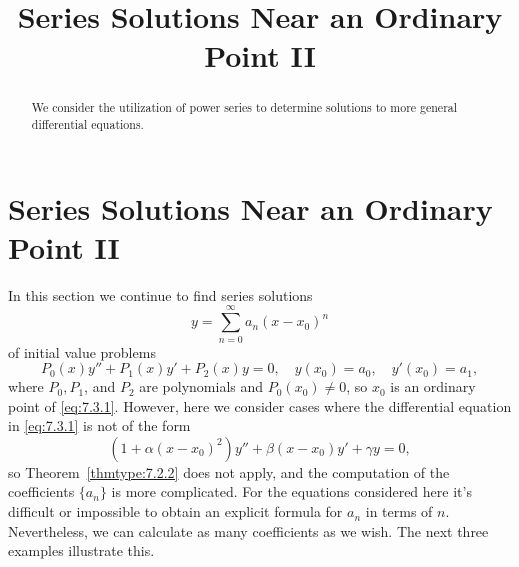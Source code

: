 \documentclass{ximera}
\title{Series Solutions Near an Ordinary Point II}%
\begin{document}
\begin{abstract}
We consider the utilization of power series to determine solutions to more general differential equations.
\end{abstract}

\maketitle

\section*{Series Solutions Near an Ordinary Point II}

In this section we continue to find series solutions
$$
y=\sum_{n=0}^\infty a_n(x-x_0)^n
$$
of initial value problems
\begin{equation} \label{eq:7.3.1}
P_0(x)y''+P_1(x)y'+P_2(x)y=0,\quad y(x_0)=a_0,\quad y'(x_0)=a_1,
\end{equation}
where $P_0,P_1$, and $P_2$ are polynomials and $P_0(x_0)\neq0$,
so $x_0$ is an ordinary point of \eqref{eq:7.3.1}.  However, here we
consider cases where the differential equation in \eqref{eq:7.3.1}
is not of the form
$$
\left(1+\alpha(x-x_0)^2\right)y''+\beta(x-x_0) y'+\gamma y=0,
$$
so Theorem~\ref{thmtype:7.2.2} does not apply, and the computation of the
coefficients $\{a_n\}$ is more complicated. For the equations
considered here it's difficult or impossible to obtain an explicit
formula for $a_n$ in terms of $n$. Nevertheless, we can calculate as
many coefficients as we wish. The next three examples illustrate
this.
\end{document}
